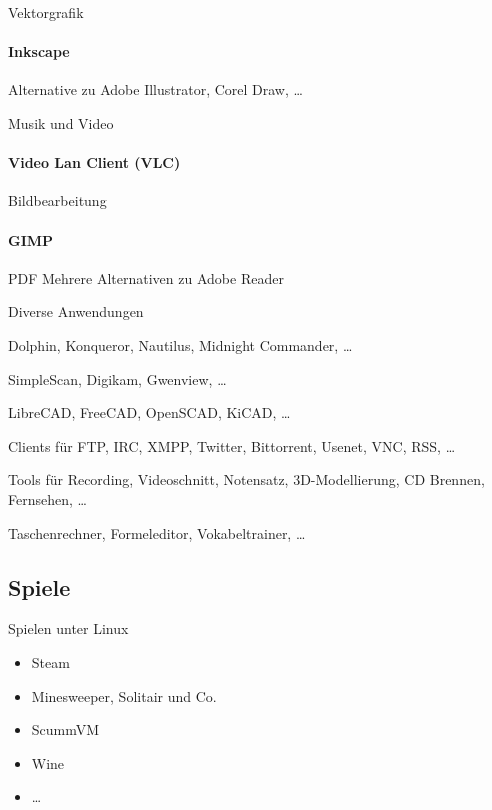 \documentclass{beamer}
\begin{document}
\begin{frame}{Vektorgrafik}
    \framesubtitle{Inkscape}
    Alternative zu Adobe Illustrator, Corel Draw, …
\end{frame}

\begin{frame}{Musik und Video}
    \framesubtitle{Video Lan Client (VLC)}
\end{frame}

\begin{frame}{Bildbearbeitung}
    \framesubtitle{GIMP}
\end{frame}

\begin{frame}{PDF}
    Mehrere Alternativen zu Adobe Reader
\end{frame}

\begin{frame}{Diverse Anwendungen}
    \begin{description}[Lernprogramme]
        \item[Dateimanager] Dolphin, Konqueror, Nautilus, Midnight
            Commander, …
        \item[Bilder] SimpleScan, Digikam, Gwenview, …
        \item[CAD] LibreCAD, FreeCAD, OpenSCAD, KiCAD, …
        \item[Internet] Clients für FTP, IRC, XMPP, Twitter, Bittorrent,
            Usenet, VNC, RSS, …
        \item[Multimedia] Tools für Recording, Videoschnitt, Notensatz,
            3D-Modellierung, CD Brennen, Fernsehen, …
        \item[Lernprogramme] Taschenrechner, Formeleditor,
            Vokabeltrainer, …
    \end{description}
\end{frame}

\subsection{Spiele}

\begin{frame}{Spielen unter Linux}
    \begin{itemize}
        \item Steam
        \item Minesweeper, Solitair und Co.
        \item ScummVM
        \item Wine
        \item …
    \end{itemize}
\end{frame}
\end{document}
